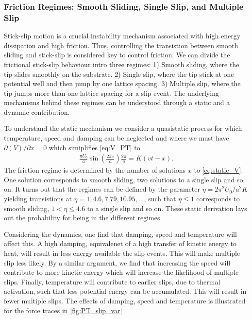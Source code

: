 \subsubsection{Friction Regimes: Smooth Sliding, Single Slip, and Multiple Slip}
Stick-slip motion is a crucial instability mechanism associated with high energy dissipation and high friction. Thus, controlling the transistion between smooth sliding and stick-slip is considered key to control friction. We can divide the frictional stick-slip behaviour intro three regimes: 1) Smooth sliding, where the tip slides smoothly on the substrate. 2) Single slip, where the tip stick at one potential well and then jump by one lattice spacing. 3) Multiple slip, where the tip jumps more than one lattice spacing for a slip event. The underlying mechanisms behind these regimes can be understood through a static and a dynamic contribution. 

To understand the static mechanism we consider a quasistatic process for which temperature, speed and damping can be neglected and where we must have $\partial(V)/\partial x = 0$ which simiplifies \cref{eq:V_PT} to 
\begin{align}
  \frac{\pi U_0}{a} \sin\left(\frac{2\pi x}{a}\right) \frac{2 \pi}{a} = K(vt - x).
  \label{eq:static_V}
\end{align}
The friction regime is determined by the number of solutions $x$ to \cref{eq:static_V}. One solution corresponds to
smooth sliding, two solutions to a single slip and so on. It turns out that the
regimes can be defined by the parameter $\eta = 2\pi^2U_0/a^2K$ \cite{Johnson_1998, Medyanik_2006} yielding transistions at $\eta = 1, 4.6, 7.79, 10.95, \hdots$, such that $\eta \le 1$
corresponds to smooth sliding, $1<\eta \le 4.6$ to a single slip and so on. These static derivation lays out the probability for being in the different regimes. 

Considering the dynamics, one find that damping, speed and temperature will affect this. A high damping, equivalenet of a high transfer
of kinetic energy to heat, will result in less energy available the slip events. This will make multiple slip less likely. By a similar argument, we find that increasing the speed will contribute to more kinetic energy which will increase the likelihood of multiple slips. Finally, temperature will contribute to earlier slips, due to thermal activation, such that
less potential energy can be accumulated. This will result in fewer multiple slips. The effects of damping, speed and temperature is illustrated for the force traces in \cref{fig:PT_slip_var}

